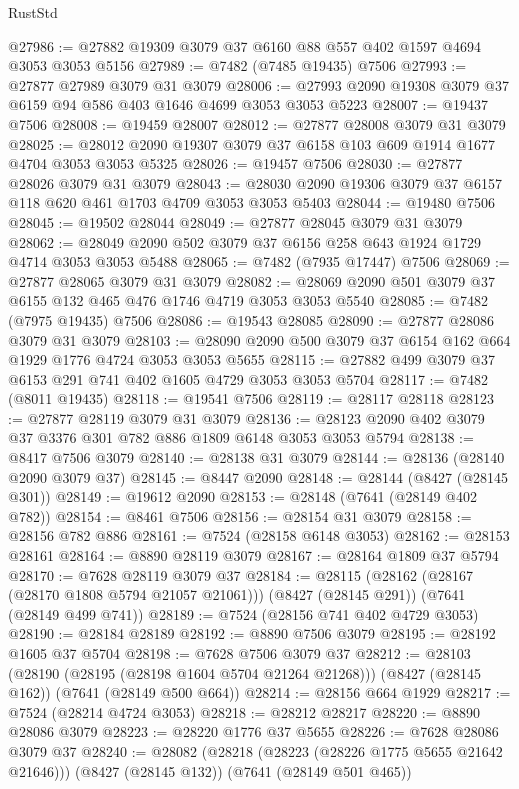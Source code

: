 \begin{lexlean}{RustStd}
\begin{coremodule}
{\begin{coremodule}
{{{{{{{{{{{{{{{{{{{{{{{{{{{{{{{{@27986 := @27882 @19309 @3079 @37 @6160 @88 @557 @402 @1597 @4694 @3053 @3053 @5156
@27989 := @7482 (@7485 @19435) @7506
@27993 := @27877 @27989 @3079 @31 @3079
@28006 := @27993 @2090 @19308 @3079 @37 @6159 @94 @586 @403 @1646 @4699 @3053 @3053 @5223
@28007 := @19437 @7506
@28008 := @19459 @28007
@28012 := @27877 @28008 @3079 @31 @3079
@28025 := @28012 @2090 @19307 @3079 @37 @6158 @103 @609 @1914 @1677 @4704 @3053 @3053 @5325
@28026 := @19457 @7506
@28030 := @27877 @28026 @3079 @31 @3079
@28043 := @28030 @2090 @19306 @3079 @37 @6157 @118 @620 @461 @1703 @4709 @3053 @3053 @5403
@28044 := @19480 @7506
@28045 := @19502 @28044
@28049 := @27877 @28045 @3079 @31 @3079
@28062 := @28049 @2090 @502 @3079 @37 @6156 @258 @643 @1924 @1729 @4714 @3053 @3053 @5488
@28065 := @7482 (@7935 @17447) @7506
@28069 := @27877 @28065 @3079 @31 @3079
@28082 := @28069 @2090 @501 @3079 @37 @6155 @132 @465 @476 @1746 @4719 @3053 @3053 @5540
@28085 := @7482 (@7975 @19435) @7506
@28086 := @19543 @28085
@28090 := @27877 @28086 @3079 @31 @3079
@28103 := @28090 @2090 @500 @3079 @37 @6154 @162 @664 @1929 @1776 @4724 @3053 @3053 @5655
@28115 := @27882 @499 @3079 @37 @6153 @291 @741 @402 @1605 @4729 @3053 @3053 @5704
@28117 := @7482 (@8011 @19435)
@28118 := @19541 @7506
@28119 := @28117 @28118
@28123 := @27877 @28119 @3079 @31 @3079
@28136 := @28123 @2090 @402 @3079 @37 @3376 @301 @782 @886 @1809 @6148 @3053 @3053 @5794
@28138 := @8417 @7506 @3079
@28140 := @28138 @31 @3079
@28144 := @28136 (@28140 @2090 @3079 @37)
@28145 := @8447 @2090
@28148 := @28144 (@8427 (@28145 @301))
@28149 := @19612 @2090
@28153 := @28148 (@7641 (@28149 @402 @782))
@28154 := @8461 @7506
@28156 := @28154 @31 @3079
@28158 := @28156 @782 @886
@28161 := @7524 (@28158 @6148 @3053)
@28162 := @28153 @28161
@28164 := @8890 @28119 @3079
@28167 := @28164 @1809 @37 @5794
@28170 := @7628 @28119 @3079 @37
@28184 := @28115
    (@28162 (@28167 (@28170 @1808 @5794 @21057 @21061)))
    (@8427 (@28145 @291))
    (@7641 (@28149 @499 @741))
@28189 := @7524 (@28156 @741 @402 @4729 @3053)
@28190 := @28184 @28189
@28192 := @8890 @7506 @3079
@28195 := @28192 @1605 @37 @5704
@28198 := @7628 @7506 @3079 @37
@28212 := @28103
    (@28190 (@28195 (@28198 @1604 @5704 @21264 @21268)))
    (@8427 (@28145 @162))
    (@7641 (@28149 @500 @664))
@28214 := @28156 @664 @1929
@28217 := @7524 (@28214 @4724 @3053)
@28218 := @28212 @28217
@28220 := @8890 @28086 @3079
@28223 := @28220 @1776 @37 @5655
@28226 := @7628 @28086 @3079 @37
@28240 := @28082
    (@28218 (@28223 (@28226 @1775 @5655 @21642 @21646)))
    (@8427 (@28145 @132))
    (@7641 (@28149 @501 @465))
}}}}}}}}}}}}}}}}}}}}}}}}}}}}}}}}
\end{coremodule}}
\end{coremodule}
\end{lexlean}
